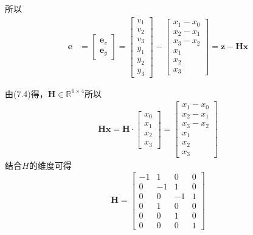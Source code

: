 \documentclass[40pt,a4paper，UTF8]{ctexart}
\numberwithin{equation}{section}
\begin{document}
所以
\begin{align}
\bm e 
&=\begin{bmatrix}
\bm e_v\\ \bm e_y
\end{bmatrix} 
=\begin{bmatrix}
v_1\\v_2\\v_3\\y_1\\y_2\\y_3
\end{bmatrix}
-\begin{bmatrix}
x_1-x_0\\x_2-x_1\\x_3-x_2\\x_1\\x_2\\x_3
\end{bmatrix}
=\bm z-\bm H\bm x
\end{align}

由(7.4)得，$\bm H\in \mathbb{R}^{6\times 4}$所以
\begin{align}
\bm{Hx}=\bm{H}\cdot
\begin{bmatrix}
x_0\\x_1\\x_2\\x_3
\end{bmatrix}
=
\begin{bmatrix}
x_1-x_0\\x_2-x_1\\x_3-x_2\\x_1\\x_2\\x_3
\end{bmatrix}
\end{align}
结合$H$的维度可得
$$
\bm H = 
\begin{bmatrix}
-1&1&0&0\\
0&-1&1&0\\
0&0&-1&1\\
0&1&0&0\\
0&0&1&0\\
0&0&0&1
\end{bmatrix}
$$
\end{document}
